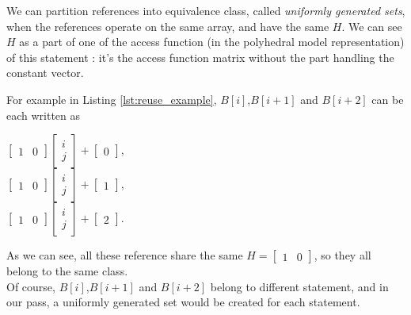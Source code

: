 \documentclass[paper=a4, fontsize=11.5pt]{scrartcl}
\numberwithin{equation}{section}        %
\numberwithin{figure}{section}          %
\numberwithin{table}{section}               %
\begin{document}
            We can partition references into equivalence class, called \textit{uniformly generated sets},
            when the references operate on the same array, and have the same $H$.
            We can see $H$ as a part of one of the access function (in the polyhedral model representation) of this statement :
            it's the access function matrix without the part handling the constant vector.

            For example in Listing \ref{lst:reuse_example}, $B[i]$,$B[i+1]$ and $B[i+2]$ can be each written as
            \begin{center}
                $
                \begin{bmatrix}
                    1 & 0
                \end{bmatrix}
                \begin{bmatrix}
                    i\\
                    j
                \end{bmatrix}
                +
                \begin{bmatrix}
                    0
                \end{bmatrix}
                $,\\
                $
                \begin{bmatrix}
                    1 & 0
                \end{bmatrix}
                \begin{bmatrix}
                    i\\
                    j
                \end{bmatrix}
                +
                \begin{bmatrix}
                    1
                \end{bmatrix}
                $,\\
                $
                \begin{bmatrix}
                    1 & 0
                \end{bmatrix}
                \begin{bmatrix}
                    i\\
                    j
                \end{bmatrix}
                +
                \begin{bmatrix}
                    2
                \end{bmatrix}
                $.
            \end{center}
            As we can see, all these reference share the same $H=\begin{bmatrix}1 & 0\end{bmatrix}$,
            so they all belong to the same class.\\
            Of course, $B[i]$,$B[i+1]$ and $B[i+2]$ belong to different statement, and in
            our pass, a uniformly generated set would be created for each statement.
\end{document}
